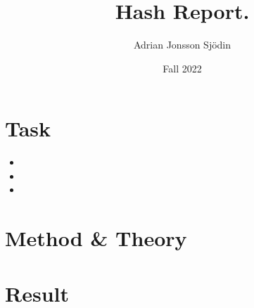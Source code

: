 \documentclass[a4paper,11pt]{article}
\begin{document}
\title{
    \textbf{Hash Report.}
}
\author{Adrian Jonsson Sjödin}
\date{Fall 2022}

\maketitle

\section{Task}
\label{task}

\begin{itemize}
    \item 
    
    \item 

    \item 

\end{itemize}

\section{Method \& Theory}
\label{method}


\section{Result}
\end{document}
